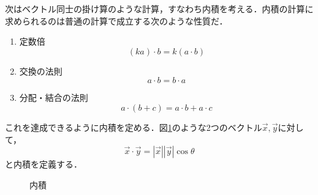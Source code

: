     次はベクトル同士の掛け算のような計算，すなわち内積を考える．内積の計算に求められるのは普通の計算で成立する次のような性質だ．
    \begin{enumerate}
        \item 定数倍
        \[
        (ka)\cdot b=k(a\cdot b)
        \]
        \item 交換の法則
        \[
        a\cdot b=b\cdot a
        \]
        \item 分配・結合の法則
        \[
        a\cdot(b+c)=a\cdot b + a\cdot c
        \]
    \end{enumerate}

    これを達成できるように内積を定める．図\ref{fig:vector_naiseki1}のような2つのベクトル$\vec{x},\vec{y}$に対して，
    \begin{equation}
        \vec{x}\cdot\vec{y}=|\vec{x}||\vec{y}|\cos\theta
        \label{eq:def_naiseki}
    \end{equation}
    と内積を定義する．
    \begin{figure}[htbp]
        \begin{center}
        \end{center}
        \caption{内積}
        \label{fig:vector_naiseki1}
    \end{figure}

